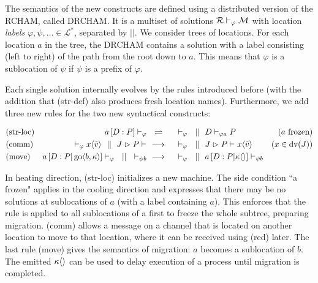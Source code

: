 The semantics of the new constructs are defined using a distributed version
of the RCHAM, called DRCHAM.
It is a multiset of solutions
$ \drchamcnf{\varphi}{\mathcal{R}}{\mathcal{M}} $
with location \emph{labels}
$ \varphi, \psi, \ldots \in \mathcal{L}^* $,
separated by $||$.
We consider trees of locations.
For each location $a$ in the tree,
the DRCHAM contains a solution with a label
consisting (left to right) of the path from the root down to $a$.
This means that $\varphi$ is a sublocation of $\psi$
if $\psi$ is a prefix of $\varphi$.

Each single solution internally evolves by the rules introduced before
(with the addition that (str-def) also produces fresh location names).
Furthermore, we add three new rules for the two new syntactical constructs:

\begin{align*}
  \drchamequ{str-loc}{(a \ \text{frozen)}}{
    \drchamcnf{\varphi}{\jloc{a}{D}{P}}{}
  }{
    \drchamcnf{\varphi}{}{}
    \drchampar
    \drchamcnf{\varphi a}{D}{P}
  }
  \\
  \drchamred{comm}{(x \in \dv{J})}{
    \drchamcnf{\varphi}{}{\jsnd{x}{\tilde{v}}}
    \drchampar
    \drchamcnf{}{\jrct{J}{P}}{}
  }{
    \drchamcnf{\varphi}{}{}
    \drchampar
    \drchamcnf{}{\jrct{J}{P}}{\jsnd{x}{\tilde{v}}}
  }
  \\
  \drchamred{move}{}{
    \drchamcnf{\varphi}{\jloc{a}{D}{P \jpar \jgo{b}{\kappa}}}{}
    \drchampar
    \drchamcnf{\psi b}{}{}
  }{
    \drchamcnf{\varphi}{}{}
    \drchampar
    \drchamcnf{\psi b}{\jloc{a}{D}{P \jpar \jsnd{\kappa}{}}}{}
  }
\end{align*}

In heating direction, (str-loc) initializes a new machine.
The side condition ``a frozen" applies in the cooling direction
and expresses that there may be no solutions at sublocations of $a$
(with a label containing $a$).
This enforces that the rule is applied to all sublocations of a first
to freeze the whole subtree, preparing migration.
(comm) allows a message on a channel that is located on another location
to move to that location, where it can be received using (red) later.
The last rule (move) gives the semantics of migration: $a$ becomes a sublocation
of $b$. The emitted $\jsnd{\kappa}{}$ can be used to delay execution of a
process until migration is completed.
